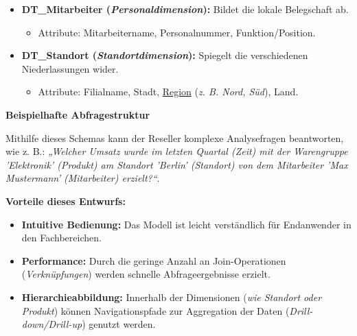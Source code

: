 \begin{enumerate}[label=\arabic*.), leftmargin=*]
\begin{itemize}
        \begin{itemize}
            \item Attribute: Produktname, \uline{Warengruppe} (\textit{Klassifizierungsmerkmal}), Marke, Maße. Hierarchien innerhalb der Dimension (\textit{\acs{z. B.} Produkt -> Warengruppe -> Produkthierarchie}) sind möglich.
        \end{itemize}
        \item \textbf{\acs{DT}\_Mitarbeiter (\textit{Personaldimension}):} Bildet die lokale Belegschaft ab.
        \begin{itemize}
            \item Attribute: Mitarbeitername, Personalnummer, Funktion/Position.
        \end{itemize}
        \item \textbf{\acs{DT}\_Standort (\textit{Standortdimension}):} Spiegelt die verschiedenen Niederlassungen wider.
        \begin{itemize}
            \item Attribute: Filialname, Stadt, \uline{Region} (\textit{\acs{z. B.} Nord, Süd}), Land.
        \end{itemize}
    \end{itemize}
\end{enumerate}
\textbf{Beispielhafte Abfragestruktur} \par Mithilfe dieses Schemas kann der Reseller komplexe Analysefragen beantworten, wie \acs{z. B.}: \textit{„Welcher Umsatz wurde im letzten Quartal (Zeit) mit der Warengruppe 'Elektronik' (Produkt) am Standort 'Berlin' (Standort) von dem Mitarbeiter 'Max Mustermann' (Mitarbeiter) erzielt?“}. \par \textbf{Vorteile dieses Entwurfs:}
\begin{itemize}
    \item \textbf{Intuitive Bedienung:} Das Modell ist leicht verständlich für Endanwender in den Fachbereichen.
    \item \textbf{Performance:} Durch die geringe Anzahl an Join-Operationen (\textit{Verknüpfungen}) werden schnelle Abfrageergebnisse erzielt.
    \item \textbf{Hierarchieabbildung:} Innerhalb der Dimensionen (\textit{wie Standort oder Produkt}) können Navigationspfade zur Aggregation der Daten (\textit{Drill-down/Drill-up}) genutzt werden.
\end{itemize}

